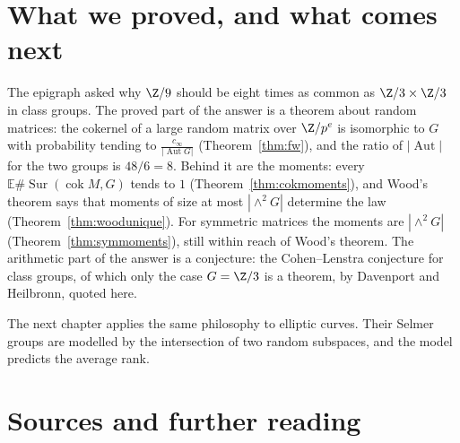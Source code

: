 \section{What we proved, and what comes next}

The epigraph asked why $\Z/9$ should be eight times as common as $\Z/3\times\Z/3$ in class groups. The proved part of the answer is a theorem about random matrices: the cokernel of a large random matrix over $\Z/p^e$ is isomorphic to $G$ with probability tending to $\frac{c_\infty}{|\operatorname{Aut}G|}$ (Theorem~\ref{thm:fw}), and the ratio of $|\operatorname{Aut}|$ for the two groups is $48/6=8$. Behind it are the moments: every $\mathbb E\#\operatorname{Sur}(\operatorname{cok}M,G)$ tends to $1$ (Theorem~\ref{thm:cokmoments}), and Wood's theorem says that moments of size at most $|\wedge^2G|$ determine the law (Theorem~\ref{thm:woodunique}). For symmetric matrices the moments are $|\wedge^2G|$ (Theorem~\ref{thm:symmoments}), still within reach of Wood's theorem. The arithmetic part of the answer is a conjecture: the Cohen--Lenstra conjecture for class groups, of which only the case $G=\Z/3$ is a theorem, by Davenport and Heilbronn, quoted here.

The next chapter applies the same philosophy to elliptic curves. Their Selmer groups are modelled by the intersection of two random subspaces, and the model predicts the average rank.

\section*{Sources and further reading}

